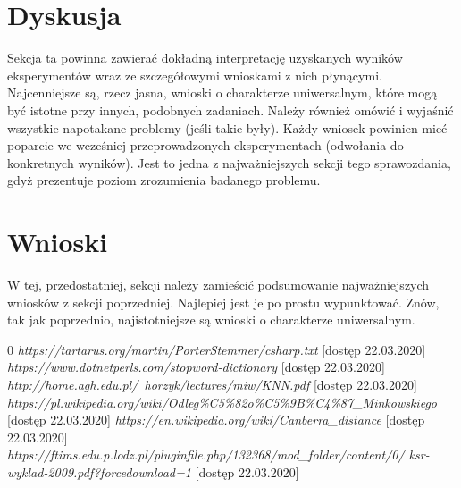 \documentclass{classrep}
\begin{document}
\newpage
\newpage
\newpage
\section{Dyskusja} %
{\color{blue}
Sekcja ta powinna zawierać dokładną interpretację uzyskanych wyników
eksperymentów wraz ze szczegółowymi wnioskami z nich płynącymi. Najcenniejsze
są, rzecz jasna, wnioski o charakterze uniwersalnym, które mogą być istotne
przy innych, podobnych zadaniach. Należy również omówić i wyjaśnić wszystkie
napotakane problemy (jeśli takie były). Każdy wniosek powinien mieć poparcie
we wcześniej przeprowadzonych eksperymentach (odwołania do konkretnych
wyników). Jest to jedna z najważniejszych sekcji tego sprawozdania, gdyż
prezentuje poziom zrozumienia badanego problemu.}
\section{Wnioski}
{\color{blue}W tej, przedostatniej, sekcji należy zamieścić podsumowanie
najważniejszych wniosków z sekcji poprzedniej. Najlepiej jest je po prostu
wypunktować. Znów, tak jak poprzednio, najistotniejsze są wnioski o
charakterze uniwersalnym.}


\begin{thebibliography} {0}
 \textsl{https://tartarus.org/martin/PorterStemmer/csharp.txt} [dostęp 22.03.2020]
 \textsl{https://www.dotnetperls.com/stopword-dictionary} [dostęp 22.03.2020]
 \textsl{http://home.agh.edu.pl/~horzyk/lectures/miw/KNN.pdf} [dostęp 22.03.2020]
 \textsl{https://pl.wikipedia.org/wiki/Odleg\%C5\%82o\%C5\%9B\%C4\%87\_Minkowskiego} [dostęp 22.03.2020]
 \textsl{https://en.wikipedia.org/wiki/Canberra\_distance} [dostęp 22.03.2020]
 \textsl{https://ftims.edu.p.lodz.pl/pluginfile.php/132368/mod\_folder/content/0/
ksr-wyklad-2009.pdf?forcedownload=1} [dostęp 22.03.2020]
\end{thebibliography}
\end{document}
